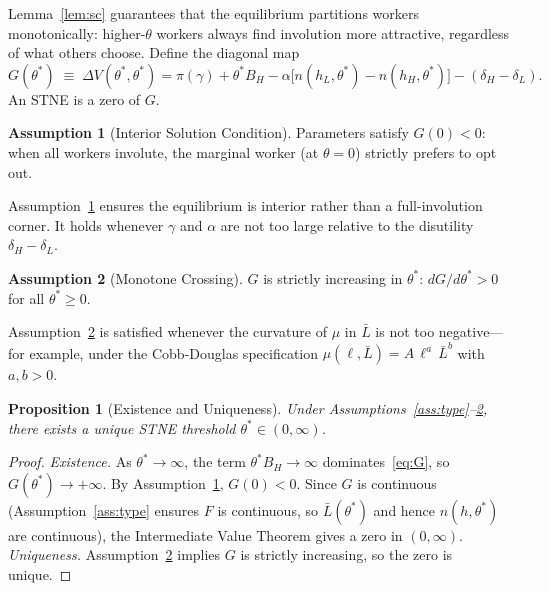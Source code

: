 \documentclass[12pt]{article}
\theoremstyle{plain}
\newtheorem{proposition}{Proposition}
\theoremstyle{definition}
\newtheorem{assumption}{Assumption}
\theoremstyle{remark}
\newcommand{\tstar}{\theta^{*}}
\newcommand{\Lbar}{\bar{L}}
\newcommand{\hH}{h_{H}}
\newcommand{\hL}{h_{L}}
\newcommand{\DeltaV}{\Delta V}
\begin{document}
Lemma~\ref{lem:sc} guarantees that the equilibrium partitions workers monotonically:
higher-$\theta$ workers always find involution more attractive, regardless of what
others choose.  Define the diagonal map
\begin{equation}
  G(\tstar) \;\equiv\; \DeltaV(\tstar, \tstar)
  = \pi(\gamma) + \tstar B_{H}
    - \alpha\bigl[n(\hL,\tstar) - n(\hH,\tstar)\bigr]
    - (\delta_{H} - \delta_{L}).
  \label{eq:G}
\end{equation}
An STNE is a zero of $G$.

\begin{assumption}[Interior Solution Condition]
\label{ass:pc1}
Parameters satisfy $G(0) < 0$: when all workers involute, the marginal worker
(at $\theta = 0$) strictly prefers to opt out.
\end{assumption}

Assumption~\ref{ass:pc1} ensures the equilibrium is interior rather than a
full-involution corner.  It holds whenever $\gamma$ and $\alpha$ are not too large
relative to the disutility $\delta_{H} - \delta_{L}$.

\begin{assumption}[Monotone Crossing]
\label{ass:mgc}
$G$ is strictly increasing in $\tstar$: $dG/d\tstar > 0$ for all $\tstar \geq 0$.
\end{assumption}

Assumption~\ref{ass:mgc} is satisfied whenever the curvature of $\mu$ in $\Lbar$ is
not too negative---for example, under the Cobb-Douglas specification
$\mu(\ell, \Lbar) = A\, \ell^{a}\, \Lbar^{b}$ with $a, b > 0$.

\begin{proposition}[Existence and Uniqueness]
\label{prop:existence}
Under Assumptions~\ref{ass:type}--\ref{ass:mgc}, there exists a unique STNE
threshold $\tstar \in (0,\infty)$.
\end{proposition}

\begin{proof}
\emph{Existence.}  As $\tstar \to \infty$, the term $\tstar B_{H} \to \infty$
dominates~\eqref{eq:G}, so $G(\tstar) \to +\infty$.  By
Assumption~\ref{ass:pc1}, $G(0) < 0$.  Since $G$ is continuous
(Assumption~\ref{ass:type} ensures $F$ is continuous, so $\Lbar(\tstar)$ and hence
$n(h,\tstar)$ are continuous), the Intermediate Value Theorem gives a zero in
$(0,\infty)$.  \emph{Uniqueness.}  Assumption~\ref{ass:mgc} implies $G$ is
strictly increasing, so the zero is unique.
\end{proof}
\end{document}
